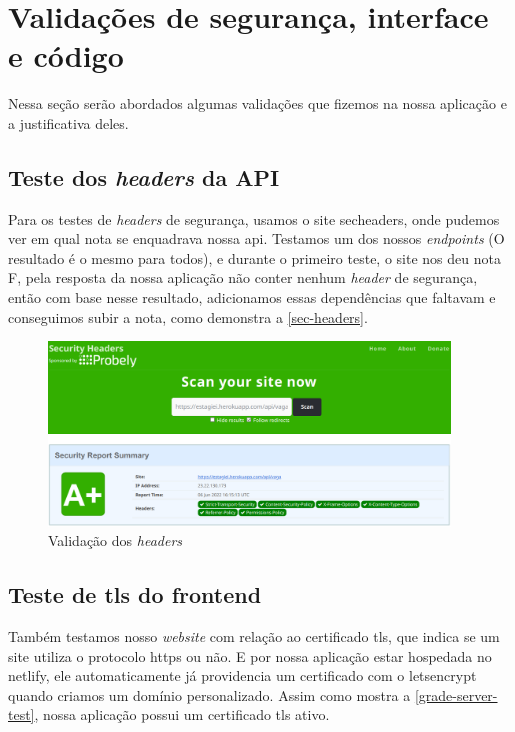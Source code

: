 \section{Validações de segurança, interface e código}
Nessa seção serão abordados algumas validações que fizemos na nossa aplicação e a justificativa deles.

\subsection{Teste dos \emph{headers} da API}
Para os testes de \emph{headers} de segurança, usamos o site \gls{secheaders}, onde pudemos ver em qual nota se enquadrava nossa \ac{api}. Testamos um dos nossos \emph{endpoints} (O resultado é o mesmo para todos), e durante o primeiro teste, o site nos deu nota F, pela resposta da nossa aplicação não conter nenhum \emph{header} de segurança, então com base nesse resultado, adicionamos essas dependências que faltavam e conseguimos subir a nota, como demonstra a \autoref{sec-headers}.

\begin{figure}[H]
	\centering
	\caption{\label{sec-headers}Validação dos \emph{headers}}
	\includegraphics[width=0.95\textwidth]{../imagens/web-tests/grade-security-headers.png}
\end{figure}

\subsection{Teste de \ac{tls} do \gls{frontend}}
Também testamos nosso \emph{website} com relação ao certificado \ac{tls}, que indica se um site utiliza o protocolo \ac{https} ou não. E por nossa aplicação estar hospedada no \gls{netlify}, ele automaticamente já providencia um certificado com o \gls{letsencrypt} quando criamos um domínio personalizado. Assim como mostra a \autoref{grade-server-test}, nossa aplicação possui um certificado \ac{tls} ativo.

